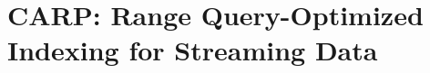 \chapter{CARP: Range Query-Optimized Indexing for Streaming Data}\label{chap:carp-paper}
\minitoc














